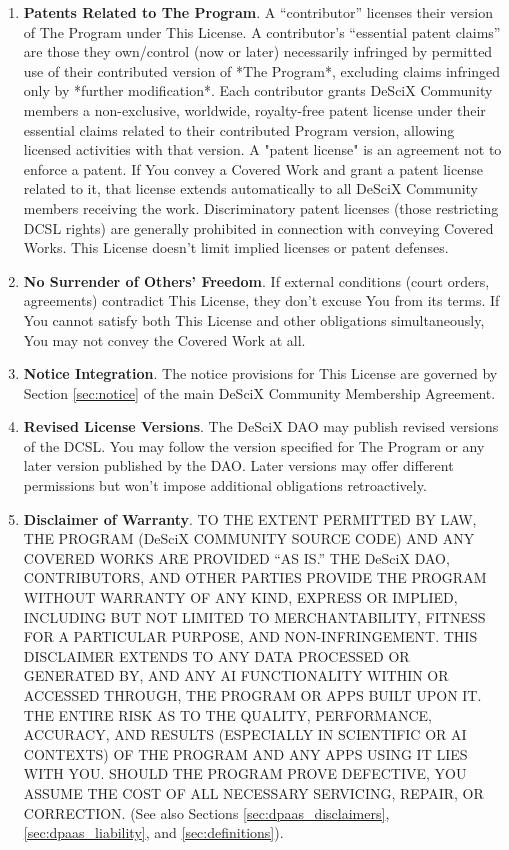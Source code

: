 \documentclass{article}
\begin{document}
\begin{enumerate}
        \item \textbf{Patents Related to The Program}. \label{dcsl:patents}
        A “contributor” licenses their version of The Program under This License. A contributor's “essential patent claims” are those they own/control (now or later) necessarily infringed by permitted use of their contributed version of *The Program*, excluding claims infringed only by *further modification*. Each contributor grants DeSciX Community members a non-exclusive, worldwide, royalty-free patent license under their essential claims related to their contributed Program version, allowing licensed activities with that version. A "patent license" is an agreement not to enforce a patent. If You convey a Covered Work and grant a patent license related to it, that license extends automatically to all DeSciX Community members receiving the work. Discriminatory patent licenses (those restricting DCSL rights) are generally prohibited in connection with conveying Covered Works. This License doesn't limit implied licenses or patent defenses.

        \item \textbf{No Surrender of Others' Freedom}.
        If external conditions (court orders, agreements) contradict This License, they don't excuse You from its terms. If You cannot satisfy both This License and other obligations simultaneously, You may not convey the Covered Work at all.

        \item \textbf{Notice Integration}.
        The notice provisions for This License are governed by Section \ref{sec:notice} of the main DeSciX Community Membership Agreement.

        \item \textbf{Revised License Versions}.
        The DeSciX DAO may publish revised versions of the DCSL. You may follow the version specified for The Program or any later version published by the DAO. Later versions may offer different permissions but won't impose additional obligations retroactively.

        \item \textbf{Disclaimer of Warranty}. \label{dcsl:disclaimer}
        TO THE EXTENT PERMITTED BY LAW, THE PROGRAM (DeSciX COMMUNITY SOURCE CODE) AND ANY COVERED WORKS ARE PROVIDED “AS IS.” THE DeSciX DAO, CONTRIBUTORS, AND OTHER PARTIES PROVIDE THE PROGRAM WITHOUT WARRANTY OF ANY KIND, EXPRESS OR IMPLIED, INCLUDING BUT NOT LIMITED TO MERCHANTABILITY, FITNESS FOR A PARTICULAR PURPOSE, AND NON-INFRINGEMENT. THIS DISCLAIMER EXTENDS TO ANY DATA PROCESSED OR GENERATED BY, AND ANY AI FUNCTIONALITY WITHIN OR ACCESSED THROUGH, THE PROGRAM OR APPS BUILT UPON IT. THE ENTIRE RISK AS TO THE QUALITY, PERFORMANCE, ACCURACY, AND RESULTS (ESPECIALLY IN SCIENTIFIC OR AI CONTEXTS) OF THE PROGRAM AND ANY APPS USING IT LIES WITH YOU. SHOULD THE PROGRAM PROVE DEFECTIVE, YOU ASSUME THE COST OF ALL NECESSARY SERVICING, REPAIR, OR CORRECTION. (See also Sections \ref{sec:dpaas_disclaimers}, \ref{sec:dpaas_liability}, and \ref{sec:definitions}).


\end{enumerate}
\end{document}
